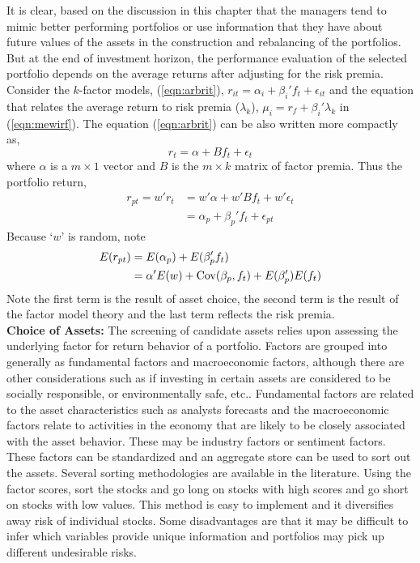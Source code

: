 It is clear, based on the discussion in this chapter that the managers tend to mimic better performing portfolios or use information that they have about future values of the assets in the construction and rebalancing of the portfolios. But at the end of investment horizon, the performance evaluation of the selected portfolio depends on the average returns after adjusting for the risk premia. Consider the $k$-factor models, (\ref{eqn:arbrit}), $r_{it}=\alpha_i + \beta_i' f_t + \epsilon_{it}$ and the equation that relates the average return to risk premia ($\lambda_k$), $\mu_i=r_f + \beta_i' \lambda_k$ in (\ref{eqn:mewirf}). The equation (\ref{eqn:arbrit}) can be also written more compactly as,
	\begin{equation}\label{eqn:compactarb}
	r_t= \alpha + B f_t + \epsilon_t
	\end{equation}
where $\alpha$ is a $m \times 1$ vector and $B$ is the $m \times k$ matrix of factor premia. Thus the portfolio return,
	\begin{equation}\label{eqn:portreturn1}
	\begin{split}
	r_{pt}= w'r_t &=w' \alpha+ w'B f_t + w' \epsilon_t \\
	&=\alpha_p + \beta_p' f_t + \epsilon_{pt}
	\end{split}
	\end{equation}
Because `$w$' is random, note
	\begin{equation}\label{eqn:portreturnrandom}
	\begin{split}
	E(r_{pt})&=E(\alpha_p) + E(\beta_p' f_t) \\
	&=\alpha' E(w)+ \Cov(\beta_p,f_t) + E(\beta_p') E(f_t)
	\end{split}
	\end{equation}
Note the first term is the result of asset choice, the second term is the result of the factor model theory and the last term reflects the risk premia. \\


\noindent \textbf{Choice of Assets:} The screening of candidate assets relies upon assessing the underlying factor for return behavior of a portfolio. Factors are grouped into generally as fundamental factors and macroeconomic factors, although there are other considerations such as if investing in certain assets are considered to be socially responsible, or environmentally safe, etc.. Fundamental factors are related to the asset characteristics such as analysts forecasts and the macroeconomic factors relate to activities in the economy that are likely to be closely associated with the asset behavior. These may be industry factors or sentiment factors. These factors can be standardized and an aggregate store can be used to sort out the assets. Several sorting methodologies are available in the literature. Using the factor scores, sort the stocks and go long on stocks with high scores and go short on stocks with low values. This method is easy to implement and it diversifies away risk of individual stocks. Some disadvantages are that it may be difficult to infer which variables provide unique information and portfolios may pick up different undesirable risks. 


